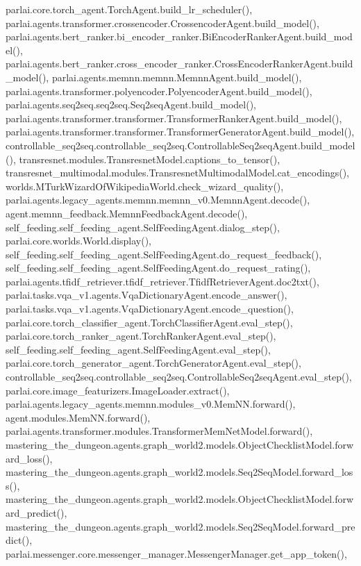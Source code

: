 parlai.\+core.\+torch\+\_\+agent.\+Torch\+Agent.\+build\+\_\+lr\+\_\+scheduler(), parlai.\+agents.\+transformer.\+crossencoder.\+Crossencoder\+Agent.\+build\+\_\+model(), parlai.\+agents.\+bert\+\_\+ranker.\+bi\+\_\+encoder\+\_\+ranker.\+Bi\+Encoder\+Ranker\+Agent.\+build\+\_\+model(), parlai.\+agents.\+bert\+\_\+ranker.\+cross\+\_\+encoder\+\_\+ranker.\+Cross\+Encoder\+Ranker\+Agent.\+build\+\_\+model(), parlai.\+agents.\+memnn.\+memnn.\+Memnn\+Agent.\+build\+\_\+model(), parlai.\+agents.\+transformer.\+polyencoder.\+Polyencoder\+Agent.\+build\+\_\+model(), parlai.\+agents.\+seq2seq.\+seq2seq.\+Seq2seq\+Agent.\+build\+\_\+model(), parlai.\+agents.\+transformer.\+transformer.\+Transformer\+Ranker\+Agent.\+build\+\_\+model(), parlai.\+agents.\+transformer.\+transformer.\+Transformer\+Generator\+Agent.\+build\+\_\+model(), controllable\+\_\+seq2seq.\+controllable\+\_\+seq2seq.\+Controllable\+Seq2seq\+Agent.\+build\+\_\+model(), transresnet.\+modules.\+Transresnet\+Model.\+captions\+\_\+to\+\_\+tensor(), transresnet\+\_\+multimodal.\+modules.\+Transresnet\+Multimodal\+Model.\+cat\+\_\+encodings(), worlds.\+M\+Turk\+Wizard\+Of\+Wikipedia\+World.\+check\+\_\+wizard\+\_\+quality(), parlai.\+agents.\+legacy\+\_\+agents.\+memnn.\+memnn\+\_\+v0.\+Memnn\+Agent.\+decode(), agent.\+memnn\+\_\+feedback.\+Memnn\+Feedback\+Agent.\+decode(), self\+\_\+feeding.\+self\+\_\+feeding\+\_\+agent.\+Self\+Feeding\+Agent.\+dialog\+\_\+step(), parlai.\+core.\+worlds.\+World.\+display(), self\+\_\+feeding.\+self\+\_\+feeding\+\_\+agent.\+Self\+Feeding\+Agent.\+do\+\_\+request\+\_\+feedback(), self\+\_\+feeding.\+self\+\_\+feeding\+\_\+agent.\+Self\+Feeding\+Agent.\+do\+\_\+request\+\_\+rating(), parlai.\+agents.\+tfidf\+\_\+retriever.\+tfidf\+\_\+retriever.\+Tfidf\+Retriever\+Agent.\+doc2txt(), parlai.\+tasks.\+vqa\+\_\+v1.\+agents.\+Vqa\+Dictionary\+Agent.\+encode\+\_\+answer(), parlai.\+tasks.\+vqa\+\_\+v1.\+agents.\+Vqa\+Dictionary\+Agent.\+encode\+\_\+question(), parlai.\+core.\+torch\+\_\+classifier\+\_\+agent.\+Torch\+Classifier\+Agent.\+eval\+\_\+step(), parlai.\+core.\+torch\+\_\+ranker\+\_\+agent.\+Torch\+Ranker\+Agent.\+eval\+\_\+step(), self\+\_\+feeding.\+self\+\_\+feeding\+\_\+agent.\+Self\+Feeding\+Agent.\+eval\+\_\+step(), parlai.\+core.\+torch\+\_\+generator\+\_\+agent.\+Torch\+Generator\+Agent.\+eval\+\_\+step(), controllable\+\_\+seq2seq.\+controllable\+\_\+seq2seq.\+Controllable\+Seq2seq\+Agent.\+eval\+\_\+step(), parlai.\+core.\+image\+\_\+featurizers.\+Image\+Loader.\+extract(), parlai.\+agents.\+legacy\+\_\+agents.\+memnn.\+modules\+\_\+v0.\+Mem\+N\+N.\+forward(), agent.\+modules.\+Mem\+N\+N.\+forward(), parlai.\+agents.\+transformer.\+modules.\+Transformer\+Mem\+Net\+Model.\+forward(), mastering\+\_\+the\+\_\+dungeon.\+agents.\+graph\+\_\+world2.\+models.\+Object\+Checklist\+Model.\+forward\+\_\+loss(), mastering\+\_\+the\+\_\+dungeon.\+agents.\+graph\+\_\+world2.\+models.\+Seq2\+Seq\+Model.\+forward\+\_\+loss(), mastering\+\_\+the\+\_\+dungeon.\+agents.\+graph\+\_\+world2.\+models.\+Object\+Checklist\+Model.\+forward\+\_\+predict(), mastering\+\_\+the\+\_\+dungeon.\+agents.\+graph\+\_\+world2.\+models.\+Seq2\+Seq\+Model.\+forward\+\_\+predict(), parlai.\+messenger.\+core.\+messenger\+\_\+manager.\+Messenger\+Manager.\+get\+\_\+app\+\_\+token(), 